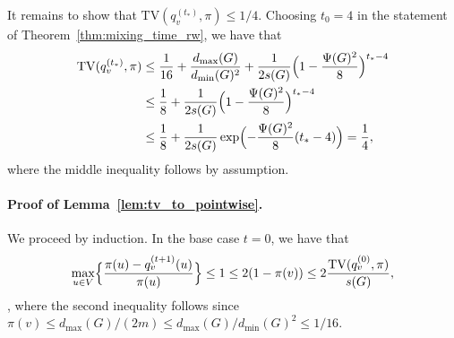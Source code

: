 	It remains to show that $\mathrm{TV}(q_v^{(t_{\ast})},\pi) \leq 1/4$. Choosing $t_0 = 4$ in the statement of Theorem~\ref{thm:mixing_time_rw}, we have that
	\begin{align*}
	\mathrm{TV}(q_v^{(t_{\ast})},\pi) & \leq \frac{1}{16} + \frac{d_{\max}(G)}{d_{\min}(G)^2} + \frac{1}{2s(G)} \Bigl(1 - \frac{\Psi(G)^2}{8}\Bigr)^{t_{\ast} - 4} \\
	& \leq \frac{1}{8} + \frac{1}{2s(G)} \Bigl(1 - \frac{\Psi(G)^2}{8}\Bigr)^{t_{\ast} - 4} \\
	& \leq \frac{1}{8} + \frac{1}{2s(G)} \exp\Bigl(-\frac{\Psi(G)^2}{8}(t_{\ast} - 4)\Bigr) = \frac{1}{4},
	\end{align*}
	where the middle inequality follows by assumption.

\paragraph{Proof of Lemma~\ref{lem:tv_to_pointwise}.}
	We proceed by induction. In the base case $t = 0$, we have that
	\begin{equation*}
	\max_{u \in V} \Bigl\{\frac{\pi(u) - q_v^{(t + 1)}(u)}{\pi(u)}\Bigr\} \leq 1 \leq 2(1 - \pi(v)) \leq 2\frac{\mathrm{TV}(q_v^{(0)},\pi)}{s(G)},
	\end{equation*},
	where the second inequality follows since $\pi(v) \leq d_{\max}(G)/(2m) \leq d_{\max}(G)/d_{\min}(G)^2 \leq 1/16$. 
	
